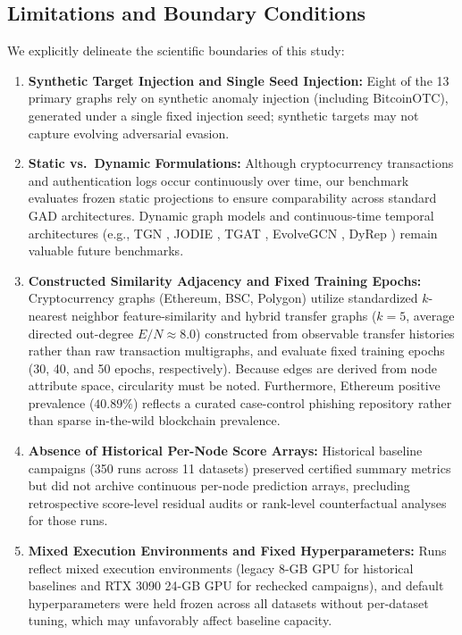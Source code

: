 \documentclass[applsci,article,submit,moreauthors,pdftex]{Definitions/mdpi}
\begin{document}
\subsection{Limitations and Boundary Conditions}
We explicitly delineate the scientific boundaries of this study:
\begin{enumerate}
    \item \textbf{Synthetic Target Injection and Single Seed Injection:} Eight of the 13 primary graphs rely on synthetic anomaly injection (including BitcoinOTC), generated under a single fixed injection seed; synthetic targets may not capture evolving adversarial evasion.
    \item \textbf{Static vs.\ Dynamic Formulations:} Although cryptocurrency transactions and authentication logs occur continuously over time, our benchmark evaluates frozen static projections to ensure comparability across standard GAD architectures. Dynamic graph models and continuous-time temporal architectures (e.g., TGN \cite{rossi2020tgn}, JODIE \cite{kumar2019jodie}, TGAT \cite{xu2020tgat}, EvolveGCN \cite{pareja2020evolvegcn}, DyRep \cite{trivedi2019dyrep}) remain valuable future benchmarks.
    \item \textbf{Constructed Similarity Adjacency and Fixed Training Epochs:} Cryptocurrency graphs (Ethereum, BSC, Polygon) utilize standardized $k$-nearest neighbor feature-similarity and hybrid transfer graphs ($k=5$, average directed out-degree $E/N \approx 8.0$) constructed from observable transfer histories rather than raw transaction multigraphs, and evaluate fixed training epochs (30, 40, and 50 epochs, respectively). Because edges are derived from node attribute space, circularity must be noted. Furthermore, Ethereum positive prevalence ($40.89\%$) reflects a curated case-control phishing repository rather than sparse in-the-wild blockchain prevalence.
    \item \textbf{Absence of Historical Per-Node Score Arrays:} Historical baseline campaigns (350 runs across 11 datasets) preserved certified summary metrics but did not archive continuous per-node prediction arrays, precluding retrospective score-level residual audits or rank-level counterfactual analyses for those runs.
    \item \textbf{Mixed Execution Environments and Fixed Hyperparameters:} Runs reflect mixed execution environments (legacy 8-GB GPU for historical baselines and RTX 3090 24-GB GPU for rechecked campaigns), and default hyperparameters were held frozen across all datasets without per-dataset tuning, which may unfavorably affect baseline capacity.

\end{enumerate}
\end{document}
